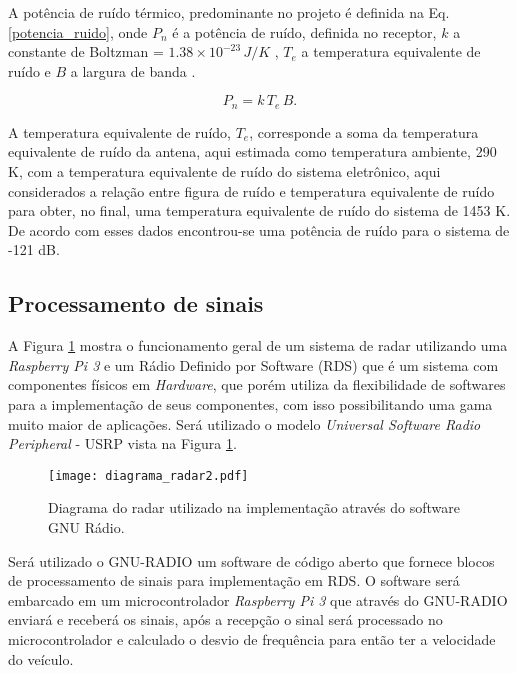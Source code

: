 A potência de ruído térmico, predominante no projeto é definida na Eq. \ref{potencia_ruido}, onde $P_n$ é a potência de ruído, definida no receptor, $k$ a constante de Boltzman = $1.38 \times 10^{-23} \, J/K$ , $T_e$ a temperatura equivalente de ruído e $B$ a largura de banda \cite{Richards}.

\begin{equation}\label{potencia_ruido}
    P_n = k\, T_e\,B.
\end{equation}

A temperatura equivalente de ruído, $T_e$, corresponde a soma da temperatura equivalente de ruído da antena, aqui estimada como temperatura ambiente, 290 K, com a temperatura equivalente de ruído do sistema eletrônico, aqui considerados a relação entre figura de ruído e temperatura equivalente de ruído para obter, no final, uma temperatura equivalente de ruído do sistema de 1453 K. De acordo com esses dados encontrou-se uma potência de ruído para o sistema de -121 dB.
\subsection{Processamento de sinais}

A Figura \ref{processos_geral_radar} mostra o funcionamento geral de um sistema de radar utilizando uma \emph{Raspberry Pi 3} e um Rádio Definido por Software (RDS) que é um sistema com componentes físicos em  \emph{Hardware}, que porém utiliza da flexibilidade de softwares para a implementação  de seus componentes, com isso possibilitando uma gama muito maior de aplicações. Será utilizado o  modelo \emph{Universal Software Radio Peripheral} - USRP vista na Figura \ref{processos_geral_radar}.



\begin{figure}[H]
    \centering
    \texttt{[image: diagrama\_radar2.pdf]}
    \caption{Diagrama do radar utilizado na implementação através do software GNU Rádio.}
    \label{processos_geral_radar}
\end{figure}

Será utilizado o GNU-RADIO um software de código aberto que fornece blocos de processamento de sinais para implementação em RDS. O software será embarcado em um microcontrolador \emph{Raspberry Pi 3} que através do GNU-RADIO enviará e receberá os sinais, após a recepção o sinal será processado no microcontrolador e calculado o desvio de frequência para então ter a velocidade do veículo. 


